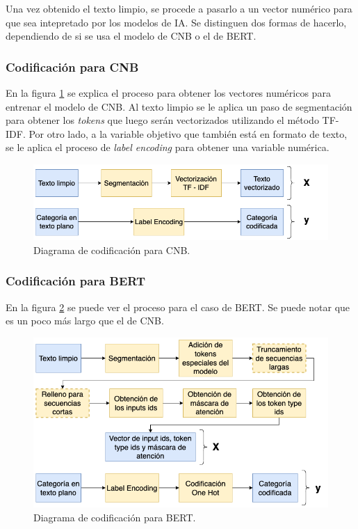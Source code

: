 Una vez obtenido el texto limpio, se procede a pasarlo a un vector numérico para que sea intepretado por los modelos de IA. Se distinguen dos formas de hacerlo, dependiendo de si se usa el modelo de CNB o el de BERT.

\subsubsection{Codificación para CNB}

En la figura \ref{fig:pipeline-baseline} se explica el proceso para obtener los vectores numéricos para entrenar el modelo de CNB. Al texto limpio se le aplica un paso de segmentación para obtener los \textit{tokens} que luego serán vectorizados utilizando el método TF-IDF. Por otro lado, a la variable objetivo que también está en formato de texto, se le aplica el proceso de \textit{label encoding} para obtener una variable numérica. 

\begin{figure}[htbp]
	\centering
	\includegraphics[width=.7\textwidth]{./Figures/pipeline-baseline.png}
	\caption{Diagrama de codificación para CNB.}
	\label{fig:pipeline-baseline}
\end{figure}

\subsubsection{Codificación para BERT}

En la figura \ref{fig:pipeline-bert} se puede ver el proceso para el caso de BERT. Se puede notar que es un poco más largo que el de CNB.

\begin{figure}[htbp]
	\centering
	\includegraphics[width=.7\textwidth]{./Figures/pipeline-bert.png}
	\caption{Diagrama de codificación para BERT.}
	\label{fig:pipeline-bert}
\end{figure}

